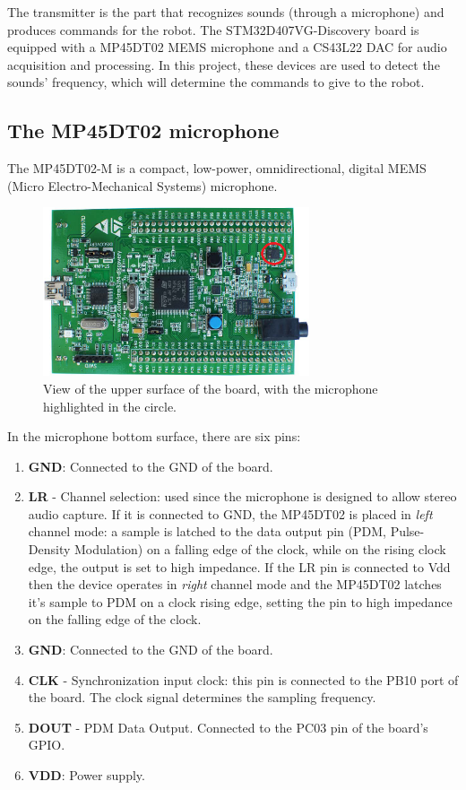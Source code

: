 The transmitter is the part that recognizes sounds (through a microphone) and produces commands for the robot. The STM32D407VG-Discovery board is equipped with a MP45DT02 MEMS microphone and a CS43L22 DAC for audio acquisition and processing. In this project, these devices are used to detect the sounds' frequency, which will determine the commands to give to the robot.

\subsection{The MP45DT02 microphone}
The MP45DT02-M is a compact, low-power, omnidirectional, digital MEMS (Micro Electro-Mechanical Systems) microphone.
\begin{figure}[H]
	\hspace*{0.15 \textwidth}\includegraphics[width= 0.7\textwidth]
	{files/images/board_view}
	\caption{View of the upper surface of the board, with the microphone highlighted in the circle.}
\end{figure}

In the microphone bottom surface, there are six pins:
\begin{enumerate}
	\item \textbf{GND}: Connected to the GND of the board.
	\item \textbf{LR} - Channel selection: used since the microphone is designed to allow stereo audio capture. If it is connected to GND, the MP45DT02 is placed in \textit{left} channel mode: a sample is latched to the data output pin (PDM, Pulse-Density Modulation) on a falling edge of the clock, while on the rising clock edge, the output is set to high impedance. If the LR pin is connected to Vdd then the device operates in \textit{right} channel mode and the MP45DT02 latches it's sample to PDM on a clock rising edge, setting the pin to high impedance on the falling edge of the clock.
	\item \textbf{GND}: Connected to the GND of the board.
	\item \textbf{CLK} - Synchronization input clock: this pin is connected to the PB10 port of the board. The clock signal determines the sampling frequency.
	\item \textbf{DOUT} - PDM Data Output. Connected to the PC03 pin of the board's GPIO.
	\item \textbf{VDD}: Power supply.
\end{enumerate}

